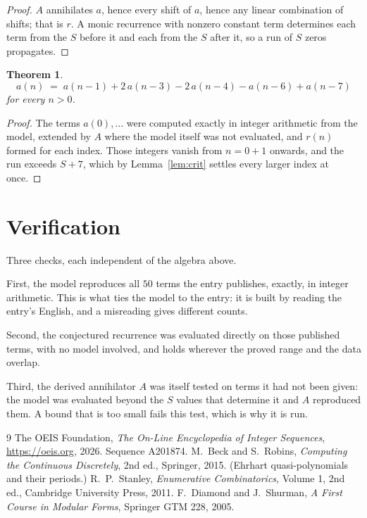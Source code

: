 \documentclass[11pt,a4paper]{article}
\theoremstyle{plain}
\newtheorem{theorem}{Theorem}
\theoremstyle{definition}
\begin{document}
\begin{proof}
$A$ annihilates $a$, hence every shift of $a$, hence any linear combination of shifts; that is
$r$. A monic recurrence with nonzero constant term determines each term from the $S$ before it
and each from the $S$ after it, so a run of $S$ zeros propagates.
\end{proof}

\begin{theorem}
\[
a(n)\;=\;a(n-1) + 2\,a(n-3) - 2\,a(n-4) - a(n-6) + a(n-7)
\]
for every $n>0$.
\end{theorem}

\begin{proof}
The terms $a(0),\dots$ were computed exactly in integer arithmetic from the model, extended by
$A$ where the model itself was not evaluated, and $r(n)$ formed for each index. Those integers
vanish from $n=0+1$ onwards, and the run exceeds $S+7$, which by
Lemma~\ref{lem:crit} settles every larger index at once.
\end{proof}

\section{Verification}

Three checks, each independent of the algebra above.

First, the model reproduces all $50$ terms the entry publishes, exactly, in integer
arithmetic. This is what ties the model to the entry: it is built by reading the entry's
English, and a misreading gives different counts.

Second, the conjectured recurrence was evaluated directly on those published terms, with no
model involved, and holds wherever the proved range and the data overlap.

Third, the derived annihilator $A$ was itself tested on terms it had not been given: the model
was evaluated beyond the $S$ values that determine it and $A$ reproduced them. A bound that is
too small fails this test, which is why it is run.

\begin{thebibliography}{9}
 The OEIS Foundation, \emph{The On-Line Encyclopedia of Integer
Sequences}, \url{https://oeis.org}, 2026. Sequence A201874.
 M.~Beck and S.~Robins, \emph{Computing the Continuous Discretely},
2nd ed., Springer, 2015. (Ehrhart quasi-polynomials and their periods.)
 R.~P.~Stanley, \emph{Enumerative Combinatorics}, Volume 1, 2nd ed.,
Cambridge University Press, 2011.
 F.~Diamond and J.~Shurman, \emph{A First Course in Modular Forms},
Springer GTM 228, 2005.
\end{thebibliography}
\end{document}
